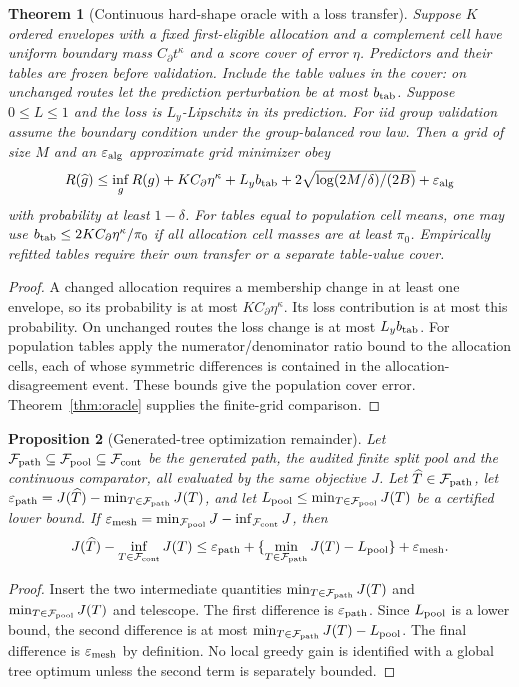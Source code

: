 \documentclass[11pt,a4paper]{article}
\numberwithin{equation}{section}
\newtheorem{theorem}{Theorem}[section]
\newtheorem{proposition}[theorem]{Proposition}
\theoremstyle{definition}\newtheorem{definition}[theorem]{Definition}
\theoremstyle{remark}\newtheorem{remark}[theorem]{Remark}
\begin{document}
\begin{theorem}[Continuous hard-shape oracle with a loss transfer]\label{thm:hardshape}
Suppose $K$ ordered envelopes with a fixed first-eligible allocation and a
complement cell have uniform boundary mass $C_\partial t^\kappa$ and a score
cover of error $\eta$. Predictors and their tables are frozen before validation.
Include the table values in the cover: on unchanged routes let the prediction
perturbation be at most $b_{\rm tab}$. Suppose $0\le L\le1$ and the loss is
$L_y$-Lipschitz in its prediction. For iid group validation assume the boundary
condition under the group-balanced row law. Then a grid of size $M$ and an
$\varepsilon_{\rm alg}$ approximate grid minimizer obey
\[
 R(\widehat g)\le\inf_gR(g)+K C_\partial\eta^\kappa
 +L_y b_{\rm tab}+2\sqrt{\log(2M/\delta)/(2B)}+\varepsilon_{\rm alg}
\]
with probability at least $1-\delta$. For tables equal to population cell means,
one may use $b_{\rm tab}\le2K C_\partial\eta^\kappa/\pi_0$ if all allocation
cell masses are at least $\pi_0$. Empirically refitted tables require their own
transfer or a separate table-value cover.
\end{theorem}
\begin{proof}
A changed allocation requires a membership change in at least one envelope,
so its probability is at most $K C_\partial\eta^\kappa$. Its loss contribution
is at most this probability. On unchanged routes the loss change is at most
$L_y b_{\rm tab}$. For population tables apply the numerator/denominator
ratio bound to the allocation cells, each of whose symmetric differences is
contained in the allocation-disagreement event. These bounds give the population
cover error. Theorem~\ref{thm:oracle} supplies the finite-grid comparison.
\end{proof}

\begin{proposition}[Generated-tree optimization remainder]\label{prop:greedy}
Let $\mathcal F_{\rm path}\subseteq\mathcal F_{\rm pool}\subseteq\mathcal F_{\rm cont}$ be the
generated path, the audited finite split pool and the continuous comparator, all evaluated by
the same objective $J$. Let $\widehat T\in\mathcal F_{\rm path}$, let
$\varepsilon_{\rm path}=J(\widehat T)-\min_{T\in\mathcal F_{\rm path}}J(T)$, and let
$L_{\rm pool}\le\min_{T\in\mathcal F_{\rm pool}}J(T)$ be a certified lower bound. If
$\varepsilon_{\rm mesh}=\min_{\mathcal F_{\rm pool}}J-\inf_{\mathcal F_{\rm cont}}J$, then
\[
 J(\widehat T)-\inf_{T\in\mathcal F_{\rm cont}}J(T)
 \le \varepsilon_{\rm path}
 +\{\min_{T\in\mathcal F_{\rm path}}J(T)-L_{\rm pool}\}
 +\varepsilon_{\rm mesh}.
\]
\end{proposition}
\begin{proof}
Insert the two intermediate quantities $\min_{T\in\mathcal F_{\rm path}}J(T)$ and
$\min_{T\in\mathcal F_{\rm pool}}J(T)$ and telescope. The first difference is
$\varepsilon_{\rm path}$. Since $L_{\rm pool}$ is a lower bound, the second difference is at
most $\min_{T\in\mathcal F_{\rm path}}J(T)-L_{\rm pool}$. The final difference is
$\varepsilon_{\rm mesh}$ by definition. No local greedy gain is identified with a global
tree optimum unless the second term is separately bounded.
\end{proof}
\end{document}
